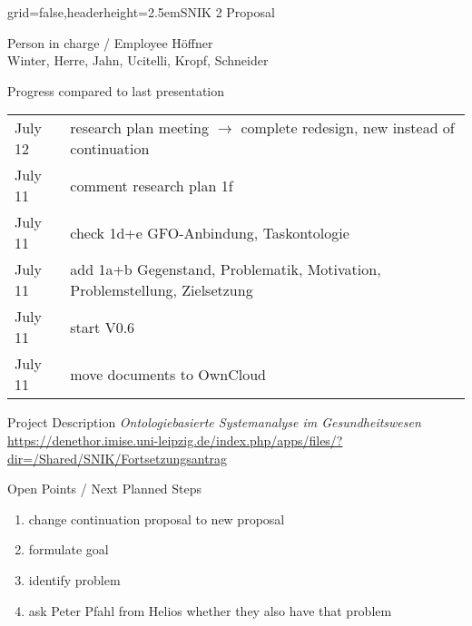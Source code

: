 \documentclass[]{kiesgrube}
\begin{document}
\begin{poster}%
{grid=false,headerheight=2.5em}{}{SNIK 2 Proposal}{}

\begin{posterbox}[name=person,column=0,row=0]{Person in charge / Employee}
Höffner\\
Winter, Herre, Jahn, Ucitelli, Kropf, Schneider
\end{posterbox}
\begin{posterbox}[name=progress,below=person]{Progress compared to last presentation}
\begin{tabulary}{\textwidth}{lL}
July 12		&research plan meeting $\rightarrow$ complete redesign, new instead of continuation\\
July 11		&comment research plan 1f\\
July 11		&check 1d+e GFO-Anbindung, Taskontologie\\
July 11		&add 1a+b Gegenstand, Problematik, Motivation, Problemstellung, Zielsetzung\\
July 11		&start V0.6\\
July 11		&move documents to OwnCloud\\
\end{tabulary}
\end{posterbox}
\begin{posterbox}[name=description,column=1,row=0]{Project Description}
\emph{Ontologiebasierte Systemanalyse im Gesundheitswesen}
\url{https://denethor.imise.uni-leipzig.de/index.php/apps/files/?dir=/Shared/SNIK/Fortsetzungsantrag}
\end{posterbox}
\begin{posterbox}[name=open,column=1,below=description]{Open Points / Next Planned Steps}
\begin{enumerate}
\item change continuation proposal to new proposal
\item formulate goal
\item identify problem
\item ask Peter Pfahl from Helios whether they also have that problem

\end{enumerate}
\end{posterbox}
\end{poster}
\end{document}
